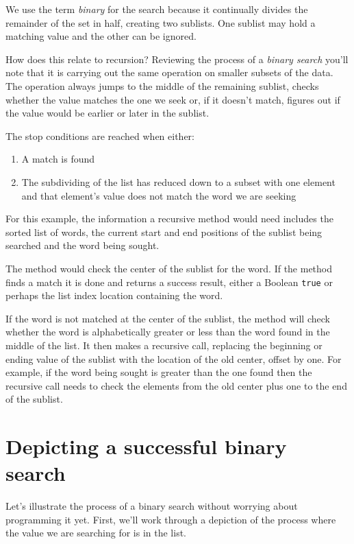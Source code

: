 
We use the term \textit{binary} for the search because it continually divides the remainder of the set in half, creating two sublists. One sublist may hold a matching value and the other can be ignored.

How does this relate to recursion? Reviewing the process of a \textit{binary search} you'll note that it is carrying out the same operation on smaller subsets of the data. The operation always jumps to the middle of the remaining sublist, checks whether the value matches the one we seek or, if it doesn't match, figures out if the value would be earlier or later in the sublist.

The stop conditions are reached when either:

\begin{enumerate}
	\item A match is found
	\item The subdividing of the list has reduced down to a subset with one element and that element's value does not match the word we are seeking
\end{enumerate}

For this example, the information a recursive method would need includes the sorted list of words, the current start and end positions of the sublist being searched and the word being sought.

The method would check the center of the sublist for the word. If the method finds a match it is done and returns a success result, either a Boolean \texttt{true} or perhaps the list index location containing the word. 

If the word is not matched at the center of the sublist, the method will check whether the word is alphabetically greater or less than the word found in the middle of the list. It then makes a recursive call, replacing the beginning or ending value of the sublist with the location of the old center, offset by one. For example, if the word being sought is greater than the one found then the recursive call needs to check the elements from the old center plus one to the end of the sublist.

\section{Depicting a successful binary search}

Let's illustrate the process of a binary search without worrying about programming it yet. First, we'll work through a depiction of the process where the value we are searching for is in the list. 

